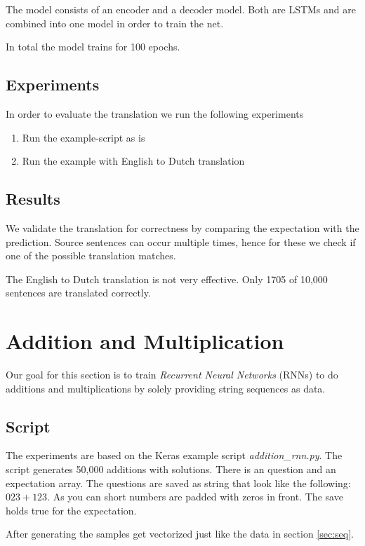 \documentclass{article}[]
\begin{document}
The model consists of an encoder and a decoder model.
Both are LSTMs and are combined into one model in order to train the net.

In total the model trains for 100 epochs.

\subsection{Experiments}
In order to evaluate the translation we run the following experiments

\begin{enumerate}
	\item{Run the example-script as is}
	\item{Run the example with English to Dutch translation}
\end{enumerate}

\subsection{Results}
We validate the translation for correctness by comparing the expectation with the prediction.
Source sentences can occur multiple times, hence for these we check if one of the possible translation matches.


The English to Dutch translation is not very effective.
Only 1705 of 10,000 sentences are translated correctly.



\section{Addition and Multiplication}
\label{sec:rnn}
Our goal for this section is to train \emph{Recurrent Neural Networks} (RNNs) to do additions and multiplications by solely providing string sequences as data.

\subsection{Script}
The experiments are based on the Keras example script \textit{addition\_rnn.py}\cite{kerasexamples}.
The script generates 50,000 additions with solutions.
There is an question and an expectation array.
The questions are saved as string that look like the following:
$023+123$.
As you can short numbers are padded with zeros in front.
The save holds true for the expectation.

After generating the samples get vectorized just like the data in section \ref{sec:seq}.
\end{document}
